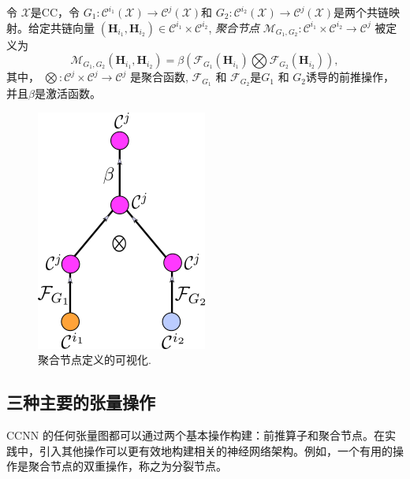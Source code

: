 \documentclass[
  12pt,
]{krantz}
\begin{document}
\label{exact-definition-merge-node}
令 \(\mathcal{X}\)是CC，令
\(G_1\colon\mathcal{C}^{i_1}(\mathcal{X})\to\mathcal{C}^j(\mathcal{X})\)和
\(G_2\colon\mathcal{C}^{i_2}(\mathcal{X})\to\mathcal{C}^j(\mathcal{X})\)是两个共链映射。给定共链向量
\((\mathbf{H}_{i_1},\mathbf{H}_{i_2}) \in \mathcal{C}^{i_1}\times \mathcal{C}^{i_2}\),
\emph{聚合节点}
\(\mathcal{M}_{G_1,G_2}\colon\mathcal{C}^{i_1} \times \mathcal{C}^{i_2} \to \mathcal{C}^j\)
被定义为 \begin{equation}
    \mathcal{M}_{G_1,G_2}(\mathbf{H}_{i_1},\mathbf{H}_{i_2})= \beta\left( \mathcal{F}_{G_1}(\mathbf{H}_{i_1})  \bigotimes \mathcal{F}_{G_2}(\mathbf{H}_{i_2}) \right),
\end{equation} 其中，
\(\bigotimes \colon \mathcal{C}^j \times \mathcal{C}^j \to \mathcal{C}^j\)
是聚合函数, \(\mathcal{F}_{G_1}\) 和 \(\mathcal{F}_{G_2}\)是\(G_1\) 和
\(G_2\)诱导的前推操作，并且\(\beta\)是激活函数。

\begin{figure}

{\centering \includegraphics{figures/merge_node_scaled} 

}

\caption{聚合节点定义的可视化.}\label{fig:merge-node}
\end{figure}

\subsection{三种主要的张量操作}\label{the-main-three-tensor-operations}

CCNN
的任何张量图都可以通过两个基本操作构建：前推算子和聚合节点。在实践中，引入其他操作可以更有效地构建相关的神经网络架构。例如，一个有用的操作是聚合节点的双重操作，称之为分裂节点。
\end{document}
